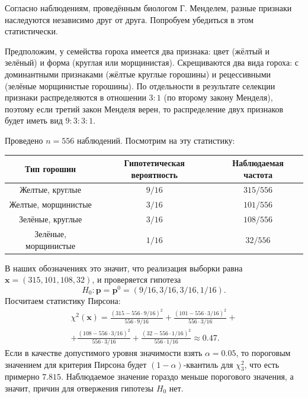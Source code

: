 \begin{example}
Согласно наблюдениям, проведённым биологом Г. Менделем, разные признаки наследуются независимо друг от друга. Попробуем убедиться в этом статистически.

Предположим, у семейства гороха имеется два признака: цвет (жёлтый и зелёный) и форма (круглая или морщинистая). Скрещиваются два вида гороха: с доминантными признаками (жёлтые круглые горошины) и рецессивными (зелёные морщинистые горошины). По отдельности в результате селекции признаки распределяются в отношении $3:1$ (по второму закону Менделя), поэтому если третий закон Менделя верен, то распределение двух признаков будет иметь вид $9:3:3:1$.

Проведено $n = 556$ наблюдений. Посмотрим на эту статистику:
\begin{center}
    \begin{tabular}{|c|c|c|}
    \hline
    Тип горошин & Гипотетическая вероятность & Наблюдаемая частота\\
    \hline
    Желтые, круглые & $9/16$ & $315/556$\\
    \hline
    Желтые, морщинистые & $3/16$ & $101/556$\\
    \hline
    Зелёные, круглые & $3/16$ & $108/556$\\
    \hline
    Зелёные, морщинистые & $1/16$ & $32/556$\\
    \hline
    \end{tabular}
\end{center}

В наших обозначениях это значит, что реализация выборки равна $\mathbf x = (315, 101, 108, 32)$, и проверяется гипотеза
\[
H_0\colon \mathbf{p} = \mathbf{p}^0 = (9/16, 3/16, 3/16, 1/16).
\]
Посчитаем статистику Пирсона:
\begin{multline*}
    \chi^2(\mathbf x) = \frac{(315 - 556 \cdot 9/16)^2}{556 \cdot 9/16} + \frac{(101 - 556 \cdot 3/16)^2}{556 \cdot 3/16} + \\
    + \frac{(108 - 556 \cdot 3/16)^2}{556 \cdot 3/16} + \frac{(32 - 556 \cdot 1/16)^2}{556 \cdot 1/16} \approx 0.47.
\end{multline*}
Если в качестве допустимого уровня значимости взять $\alpha = 0.05$, то пороговым значением для критерия Пирсона будет $(1-\alpha)$-квантиль для $\chi^2_3$, что есть примерно $7.815$. Наблюдаемое значение гораздо меньше порогового значения, а значит, причин для отвержения гипотезы $H_0$ нет.
\end{example}

